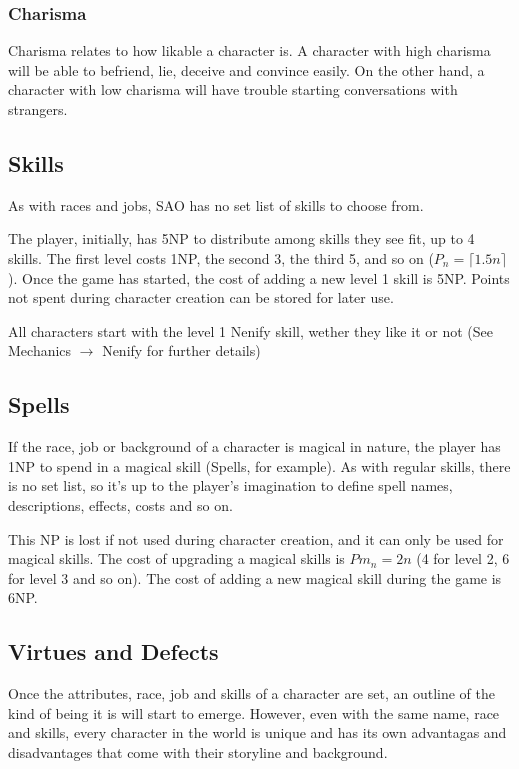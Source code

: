 \subsubsection*{Charisma}
Charisma relates to how likable a character is. A character with high charisma will be able to befriend, lie, deceive and convince easily. On the other hand, a character with low charisma will have trouble starting conversations with strangers. 

\subsection{Skills}

As with races and jobs, SAO has no set list of skills to choose from.
\par 
The player, initially, has 5NP to distribute among skills they see fit, up to 4 skills. The first level costs 1NP, the second 3, the third 5, and so on ($P_{n}=\lceil1.5n\rceil$). Once the game has started, the cost of adding a new level 1 skill is 5NP. Points not spent during character creation can be stored for later use. 
\par
All characters start with the level 1 Nenify skill, wether they like it or not (See Mechanics $\rightarrow$ Nenify for further details)

\subsection{Spells}

If the race, job or background of a character is magical in nature, the player has 1NP to spend in a magical skill (Spells, for example). As with regular skills, there is no set list, so it's up to the player's imagination to define spell names, descriptions, effects, costs and so on.
\par 
This NP is lost if not used during character creation, and it can only be used for magical skills. The cost of upgrading a magical skills is $Pm_{n}=2n$ (4 for level 2, 6 for level 3 and so on). The cost of adding a new magical skill during the game is 6NP.

\subsection{Virtues and Defects}

Once the attributes, race, job and skills of a character are set, an outline of the kind of being it is will start to emerge. However, even with the same name, race and skills, every character in the world is unique and has its own advantagas and disadvantages that come with their storyline and background.

